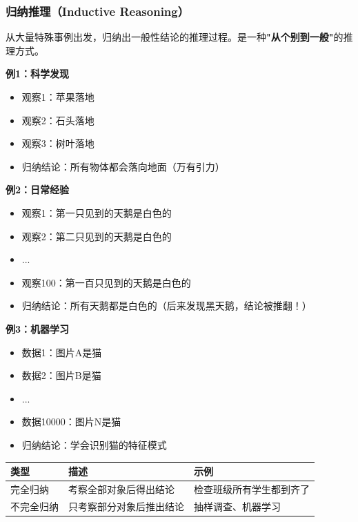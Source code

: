 \subsubsection{归纳推理（Inductive Reasoning）}
\begin{conceptbox}
从大量特殊事例出发，归纳出一般性结论的推理过程。是一种\textbf{"从个别到一般"}的推理方式。
\end{conceptbox}

\begin{examplebox}[例子：归纳推理的生活应用]
\textbf{例1：科学发现}
\begin{itemize}[itemsep=0pt]
    \item 观察1：苹果落地
    \item 观察2：石头落地
    \item 观察3：树叶落地
    \item 归纳结论：所有物体都会落向地面（万有引力）
\end{itemize}

\textbf{例2：日常经验}
\begin{itemize}[itemsep=0pt]
    \item 观察1：第一只见到的天鹅是白色的
    \item 观察2：第二只见到的天鹅是白色的
    \item ...
    \item 观察100：第一百只见到的天鹅是白色的
    \item 归纳结论：所有天鹅都是白色的（后来发现黑天鹅，结论被推翻！）
\end{itemize}

\textbf{例3：机器学习}
\begin{itemize}[itemsep=0pt]
    \item 数据1：图片A是猫
    \item 数据2：图片B是猫
    \item ...
    \item 数据10000：图片N是猫
    \item 归纳结论：学会识别猫的特征模式
\end{itemize}
\end{examplebox}

\begin{table}[htbp]
\centering\small
\begin{tabular}{lll}
\toprule
\textbf{类型} & \textbf{描述} & \textbf{示例} \\
\midrule
完全归纳 & 考察全部对象后得出结论 & 检查班级所有学生都到齐了 \\
不完全归纳 & 只考察部分对象后推出结论 & 抽样调查、机器学习 \\
\bottomrule
\end{tabular}
\end{table}

